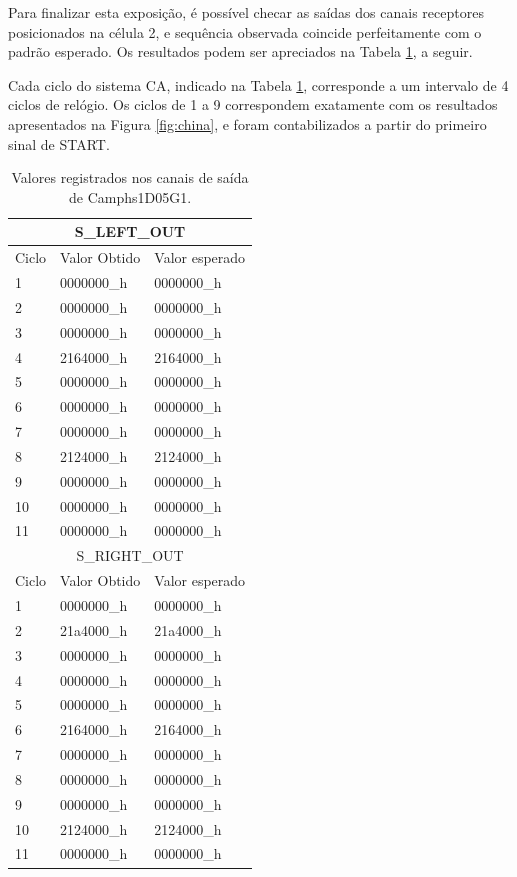 Para finalizar esta exposição, é possível checar as saídas dos canais receptores posicionados na célula 2, e sequência observada coincide perfeitamente com o padrão esperado. Os resultados podem ser apreciados na Tabela \ref{tab:cinco}, a seguir. 

Cada ciclo do sistema CA, indicado na Tabela \ref{tab:cinco}, corresponde a um intervalo de 4 ciclos de relógio. Os ciclos de 1 a 9 correspondem exatamente com os resultados apresentados na Figura \ref{fig:china}, e foram contabilizados a partir do primeiro sinal de START.

\begin{table}
\centering
\caption{\label{tab:cinco} Valores registrados nos canais de saída de Camphs1D05G1.}
\begin{tabular}{ |p{3cm}|p{3cm}|p{3cm}| }
 \hline
 \multicolumn{3}{|c|}{S\_LEFT\_OUT} \\
 \hline \hline
Ciclo & Valor Obtido & Valor esperado \\
 \hline
 1 & 0000000_h & 0000000_h \\
 2 & 0000000_h & 0000000_h \\
 3 & 0000000_h & 0000000_h \\
 4 & 2164000_h & 2164000_h \\
 5 & 0000000_h & 0000000_h \\
 6 & 0000000_h & 0000000_h \\
 7 & 0000000_h & 0000000_h \\
 8 & 2124000_h & 2124000_h \\
 9 & 0000000_h & 0000000_h \\
 10 & 0000000_h & 0000000_h \\
 11 & 0000000_h & 0000000_h \\
 \hline
 \multicolumn{3}{|c|}{S\_RIGHT\_OUT} \\
 \hline \hline
Ciclo & Valor Obtido & Valor esperado \\
 \hline
 1 & 0000000_h & 0000000_h \\
 2 & 21a4000_h & 21a4000_h \\
 3 & 0000000_h & 0000000_h \\
 4 & 0000000_h & 0000000_h \\
 5 & 0000000_h & 0000000_h \\
 6 & 2164000_h & 2164000_h \\
 7 & 0000000_h & 0000000_h \\
 8 & 0000000_h & 0000000_h \\
 9 & 0000000_h & 0000000_h \\
 10 & 2124000_h & 2124000_h \\
 11 & 0000000_h & 0000000_h \\
 \hline
\end{tabular}
\end{table}

